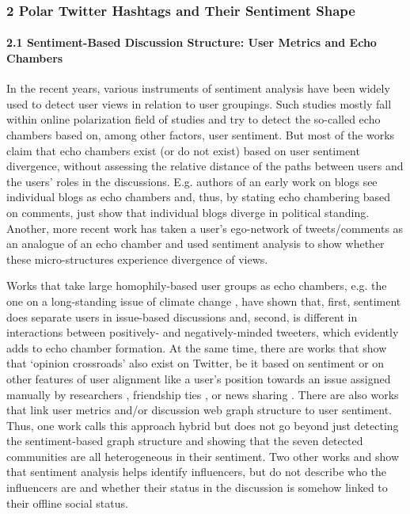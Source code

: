 \subsubsection{2 Polar Twitter Hashtags and Their Sentiment Shape}

\paragraph{2.1 Sentiment-Based Discussion Structure: User Metrics and Echo Chambers} In the recent years, various instruments of sentiment analysis have been widely used to detect user views in relation to user groupings. Such studies mostly fall within online polarization field of studies and try to detect the so-called echo chambers based on, among other factors, user sentiment. But most of the works claim that echo chambers exist (or do not exist) based on user sentiment divergence, without assessing the relative distance of the paths between users and the users’ roles in the discussions. E.g. authors of an early work on blogs \cite{GilbertBergstromKarahalios} see individual blogs as echo chambers and, thus, by stating echo chambering based on comments, just show that individual blogs diverge in political standing. Another, more recent work \cite{HundtSchneiderElAssady} has taken a user’s ego-network of tweets/comments as an analogue of an echo chamber and used sentiment analysis to show whether these micro-structures experience divergence of views.

Works that take large homophily-based user groups as echo chambers, e.g. the one on a long-standing issue of climate change \cite{WilliamsMcMurrayKurz}, have shown that, first, sentiment does separate users in issue-based discussions and, second, is different in interactions between positively- and negatively-minded tweeters, which evidently adds to echo chamber formation. At the same time, there are works that show that ‘opinion crossroads’ also exist on Twitter, be it based on sentiment \cite{GruzdRoy} or on other features of user alignment like a user’s position towards an issue assigned manually by researchers \cite{YardiBoyd}, friendship ties \cite{ConoverRatkiewiczFrancisco}, or news sharing \cite{HerdaugdelenZuoGardMurray}. There are also works that link user metrics and/or discussion web graph structure to user sentiment. Thus, one work calls this approach hybrid \cite{AlamsyahAdityawarman} but does not go beyond just detecting the sentiment-based graph structure and showing that the seven detected communities are all heterogeneous in their sentiment. Two other works \cite{StieglitzDangXuan} and \cite{BigonhaCardosoMoro} show that sentiment analysis helps identify influencers, but do not describe who the influencers are and whether their status in the discussion is somehow linked to their offline social status.


